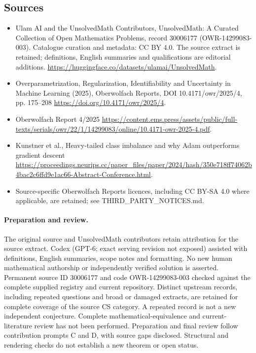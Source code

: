 \documentclass[11pt]{article}
\begin{document}
\subsection{Sources}
\begin{itemize}
\item[\hypertarget{source:30006177:1}{S1}] Ulam AI and the UnsolvedMath Contributors, UnsolvedMath: A Curated Collection of Open Mathematics Problems, record 30006177 (OWR-14299083-003). Catalogue curation and metadata: CC BY 4.0. The source extract is retained; definitions, English summaries and qualifications are editorial additions.
\url{https://huggingface.co/datasets/ulamai/UnsolvedMath}.
\item[\hypertarget{source:30006177:2}{S2}] Overparametrization, Regularization, Identifiability and Uncertainty in Machine Learning (2025), Oberwolfach Reports, DOI 10.4171/owr/2025/4, pp. 175--208
\url{https://doi.org/10.4171/owr/2025/4}.
\item[\hypertarget{source:30006177:3}{S3}] Oberwolfach Report 4/2025
\url{https://content.ems.press/assets/public/full-texts/serials/owr/22/1/14299083/online/10.4171-owr-2025-4.pdf}.
\item[\hypertarget{source:30006177:4}{S4}] Kunstner et al., Heavy-tailed class imbalance and why Adam outperforms gradient descent
\url{https://proceedings.neurips.cc/paper_files/paper/2024/hash/350e718ff74062b4bac2c6ffd9e1ac66-Abstract-Conference.html}.
\item Source-specific Oberwolfach Reports licences, including CC BY-SA 4.0 where applicable, are retained; see THIRD\_PARTY\_NOTICES.md.
\end{itemize}
\paragraph{Preparation and review.}
The original source and UnsolvedMath contributors retain attribution for the source extract. Codex (GPT-6; exact serving revision not exposed) assisted with definitions, English summaries, scope notes and formatting. No new human mathematical authorship or independently verified solution is asserted. Permanent source ID 30006177 and code OWR-14299083-003 checked against the complete supplied registry and current repository. Distinct upstream records, including repeated questions and broad or damaged extracts, are retained for complete coverage of the source CS category. A repeated record is not a new independent conjecture. Complete mathematical-equivalence and current-literature review has not been performed. Preparation and final review follow contribution prompts C and D, with source gaps disclosed. Structural and rendering checks do not establish a new theorem or open status.
\label{end:30006177}
\end{document}
